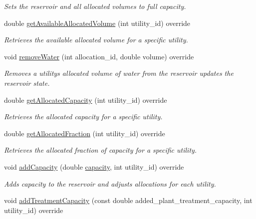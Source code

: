 \begin{DoxyCompactItemize}
\begin{DoxyCompactList}\small\item\em Sets the reservoir and all allocated volumes to full capacity. \end{DoxyCompactList}\item 
double \mbox{\hyperlink{classAllocatedReservoir_ae161ebfc285aa69cb8b7f4fe20ee7a2e}{get\+Available\+Allocated\+Volume}} (int utility\+\_\+id) override
\begin{DoxyCompactList}\small\item\em Retrieves the available allocated volume for a specific utility. \end{DoxyCompactList}\item 
void \mbox{\hyperlink{classAllocatedReservoir_a3a9b7ce2e1d42cc373095cfd40ef2ae2}{remove\+Water}} (int allocation\+\_\+id, double volume) override
\begin{DoxyCompactList}\small\item\em Removes a utility\textquotesingle{}s allocated volume of water from the reservoir updates the reservoir state. \end{DoxyCompactList}\item 
double \mbox{\hyperlink{classAllocatedReservoir_a8b9b38494fa23f0bea78134c82644bf1}{get\+Allocated\+Capacity}} (int utility\+\_\+id) override
\begin{DoxyCompactList}\small\item\em Retrieves the allocated capacity for a specific utility. \end{DoxyCompactList}\item 
double \mbox{\hyperlink{classAllocatedReservoir_a731381982c9245b0bf24db4082dc74c1}{get\+Allocated\+Fraction}} (int utility\+\_\+id) override
\begin{DoxyCompactList}\small\item\em Retrieves the allocated fraction of capacity for a specific utility. \end{DoxyCompactList}\item 
void \mbox{\hyperlink{classAllocatedReservoir_a191cf4347eb2ea57b203c102f8fc805e}{add\+Capacity}} (double \mbox{\hyperlink{classWaterSource_a2ec257b415b248214a8bce7fc5267723}{capacity}}, int utility\+\_\+id) override
\begin{DoxyCompactList}\small\item\em Adds capacity to the reservoir and adjusts allocations for each utility. \end{DoxyCompactList}\item 
void \mbox{\hyperlink{classAllocatedReservoir_ab781bee3253277f1dcfa4c12756d9d6f}{add\+Treatment\+Capacity}} (const double added\+\_\+plant\+\_\+treatment\+\_\+capacity, int utility\+\_\+id) override

\end{DoxyCompactItemize}
